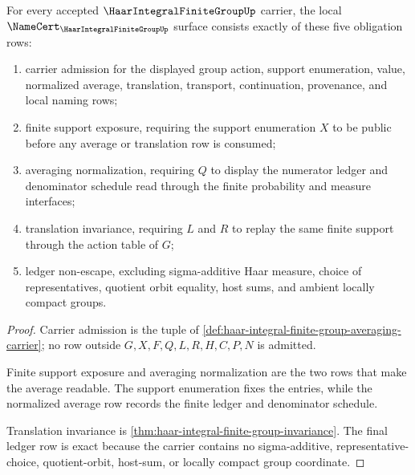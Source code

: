 \begin{theorem}
\label{thm:haar-integral-finite-group-namecert-obligations}
For every accepted $\HaarIntegralFiniteGroupUp$ carrier, the local $\NameCert_{\HaarIntegralFiniteGroupUp}$ surface consists exactly of these five obligation rows:
\begin{enumerate}
\item carrier admission for the displayed group action, support enumeration, value, normalized average, translation, transport, continuation, provenance, and local naming rows;
\item finite support exposure, requiring the support enumeration $X$ to be public before any average or translation row is consumed;
\item averaging normalization, requiring $Q$ to display the numerator ledger and denominator schedule read through the finite probability and measure interfaces;
\item translation invariance, requiring $L$ and $R$ to replay the same finite support through the action table of $G$;
\item ledger non-escape, excluding sigma-additive Haar measure, choice of representatives, quotient orbit equality, host sums, and ambient locally compact groups.
\end{enumerate}
\end{theorem}
\begin{proof}
Carrier admission is the tuple of \autoref{def:haar-integral-finite-group-averaging-carrier}; no row outside $G,X,F,Q,L,R,H,C,P,N$ is admitted.

Finite support exposure and averaging normalization are the two rows that make the average readable. The support enumeration fixes the entries, while the normalized average row records the finite ledger and denominator schedule.

Translation invariance is \autoref{thm:haar-integral-finite-group-invariance}. The final ledger row is exact because the carrier contains no sigma-additive, representative-choice, quotient-orbit, host-sum, or locally compact group coordinate.
\end{proof}

